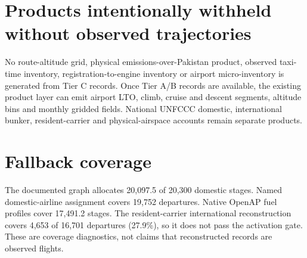 \documentclass[5p,times,authoryear]{elsarticle}
\begin{document}


\section{Products intentionally withheld without observed trajectories}

No route-altitude grid, physical emissions-over-Pakistan product, observed taxi-time inventory,
registration-to-engine inventory or airport micro-inventory is generated from Tier C records.
Once Tier A/B records are available, the existing product layer can emit airport LTO, climb,
cruise and descent segments, altitude bins and monthly gridded fields. National UNFCCC domestic,
international bunker, resident-carrier and physical-airspace accounts remain separate products.

\section{Fallback coverage}

The documented graph allocates 20,097.5 of 20,300 domestic stages. Named domestic-airline
assignment covers 19,752 departures. Native OpenAP fuel profiles cover 17,491.2 stages. The
resident-carrier international reconstruction covers 4,653 of 16,701 departures (27.9\%), so it
does not pass the activation gate. These are coverage diagnostics, not claims that reconstructed
records are observed flights.





\end{document}
